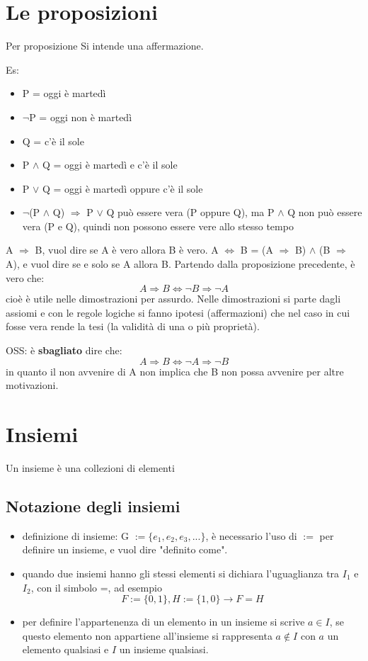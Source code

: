 \documentclass[a4paper,12pt]{article}
\begin{document}
	\section{Le proposizioni}
	Per proposizione Si intende una affermazione.
	
	Es:
		\begin{itemize}
			\item P = oggi è martedì
			\item $\neg$P = oggi non è martedì
			\item Q = c'è il sole
			\item P $\wedge$ Q = oggi è martedì e c'è il sole
			\item P $\vee$ Q = oggi è martedì oppure c'è il sole
			
			\item $\neg$(P $\wedge$ Q) $\Rightarrow$ P $\vee$ Q può essere vera (P oppure Q), ma P $\wedge$ Q non può essere vera (P e Q), quindi non possono essere vere allo stesso tempo
		\end{itemize}
	A $\Rightarrow$ B, vuol dire se A è vero allora B è vero. \newline
	A $\iff$ B = (A $\Rightarrow$ B) $\wedge$ (B $\Rightarrow$ A), e vuol dire se e solo se A allora B.\newline
	Partendo dalla proposizione precedente, è vero che:
	\[
	A \Rightarrow B \iff \neg B \Rightarrow \neg A
	\]
	cioè è utile nelle dimostrazioni per assurdo. Nelle dimostrazioni si parte dagli assiomi e con le regole logiche si fanno ipotesi (affermazioni) che nel caso in cui fosse vera rende la tesi (la validità di una o più proprietà).
	
	OSS: è \textbf{sbagliato} dire che:
	\[
	A \Rightarrow B \iff \neg A \Rightarrow \neg B
	\]
	in quanto il non avvenire di A non implica che B non possa avvenire per altre motivazioni.
	
	\section{Insiemi}
	Un insieme è una collezioni di elementi
	\subsection{Notazione degli insiemi}
	\begin{itemize}
		\item definizione di insieme: G $:= \{e_1, e_2, e_3, ...\}$, è necessario l'uso di $:=$ per definire un insieme, e vuol dire "definito come".
		\item quando due insiemi hanno gli stessi elementi si dichiara l'uguaglianza tra $I_1$ e $I_2$, con il simbolo =, ad esempio
		\[
		F := \{0, 1\}, H := \{1, 0\} \rightarrow F = H
		\]
		\item per definire l'appartenenza di un elemento in un insieme si scrive $a \in I$,  se questo elemento non appartiene all'insieme si rappresenta $a \not \in I$ con $a$ un elemento qualsiasi e $I$ un insieme qualsiasi.
		
	\end{itemize}
\end{document}
